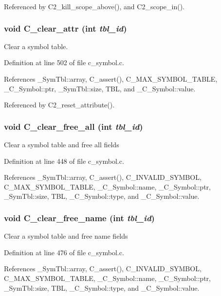 Referenced by C2\_\-kill\_\-scope\_\-above(), and C2\_\-scope\_\-in().
\subsubsection{\setlength{\rightskip}{0pt plus 5cm}void C\_\-clear\_\-attr (int {\em tbl\_\-id})}\label{c__symbol_8c_ec887c3f5afd02e24ba755048268e0e0}


Clear a symbol table. 

Definition at line 502 of file c\_\-symbol.c.

References \_\-Sym\-Tbl::array, C\_\-assert(), C\_\-MAX\_\-SYMBOL\_\-TABLE, \_\-C\_\-Symbol::ptr, \_\-Sym\-Tbl::size, TBL, and \_\-C\_\-Symbol::value.

Referenced by C2\_\-reset\_\-attribute().
\subsubsection{\setlength{\rightskip}{0pt plus 5cm}void C\_\-clear\_\-free\_\-all (int {\em tbl\_\-id})}\label{c__symbol_8c_dc760e695d2d45490fa60d1984cb2d59}


Clear a symbol table and free all fields 

Definition at line 448 of file c\_\-symbol.c.

References \_\-Sym\-Tbl::array, C\_\-assert(), C\_\-INVALID\_\-SYMBOL, C\_\-MAX\_\-SYMBOL\_\-TABLE, \_\-C\_\-Symbol::name, \_\-C\_\-Symbol::ptr, \_\-Sym\-Tbl::size, TBL, \_\-C\_\-Symbol::type, and \_\-C\_\-Symbol::value.
\subsubsection{\setlength{\rightskip}{0pt plus 5cm}void C\_\-clear\_\-free\_\-name (int {\em tbl\_\-id})}\label{c__symbol_8c_b358a580d5e4af034117efd93533d1cf}


Clear a symbol table and free name fields 

Definition at line 476 of file c\_\-symbol.c.

References \_\-Sym\-Tbl::array, C\_\-assert(), C\_\-INVALID\_\-SYMBOL, C\_\-MAX\_\-SYMBOL\_\-TABLE, \_\-C\_\-Symbol::name, \_\-C\_\-Symbol::ptr, \_\-Sym\-Tbl::size, TBL, \_\-C\_\-Symbol::type, and \_\-C\_\-Symbol::value.
